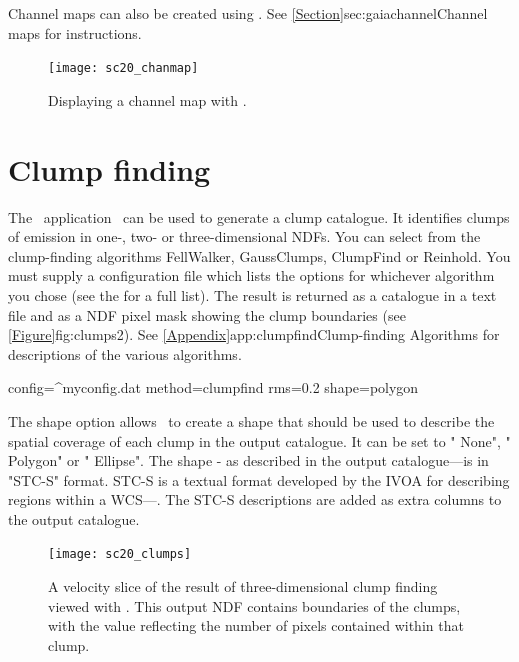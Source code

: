 \documentclass[11pt,oneside,chapters]{starlink}
\begin{document}
Channel maps can also be created using \gaia. See
\cref{Section}{sec:gaiachannel}{Channel maps} for instructions.


\begin{figure}[h!]
\begin{center}
\texttt{[image: sc20\_chanmap]}
\caption[Displaying a channel map with \gaia.]{\label{fig:chanmap}
  Displaying a channel map with \gaia.}
\end{center}
\end{figure}

\section{Clump finding}
\label{sec:clumpfind}

The \cupid\ application \findclumps\ can be used to generate a clump
catalogue. It identifies clumps of emission in one-, two- or
three-dimensional NDFs. You can select from the clump-finding
algorithms FellWalker, GaussClumps, ClumpFind or Reinhold. You must
supply a configuration file which lists the options for whichever
algorithm you chose (see the 
for a full list). The result is returned as a catalogue in a text file
and as a NDF pixel mask showing the clump boundaries (see
\cref{Figure}{fig:clumps2}{}). See
\cref{Appendix}{app:clumpfind}{Clump-finding Algorithms} for
descriptions of the various algorithms.

\begin{terminalv}
  config=^myconfig.dat method=clumpfind rms=0.2 shape=polygon
\end{terminalv}

The shape option allows \findclumps\ to create a shape that should be
used to describe the spatial coverage of each clump in the output
catalogue. It can be set to " None", " Polygon" or " Ellipse". The shape
- as described in the output catalogue---is in "STC-S" format. STC-S is
a textual format developed by the IVOA for describing regions within
a WCS---.
The STC-S descriptions are added as extra columns to the output catalogue.
\vspace{0.7cm}
\begin{figure}[h!]
\begin{center}
\texttt{[image: sc20\_clumps]}
\caption[A velocity slice of the result of three-dimensional clump finding
viewed with \gaia.]{\label{fig:clumps2}
  A velocity slice of the result of three-dimensional clump finding viewed
  with \gaia. This output NDF contains boundaries of the clumps, with the
  value reflecting the number of pixels contained within that clump.}
\end{center}
\end{figure}
\end{document}
